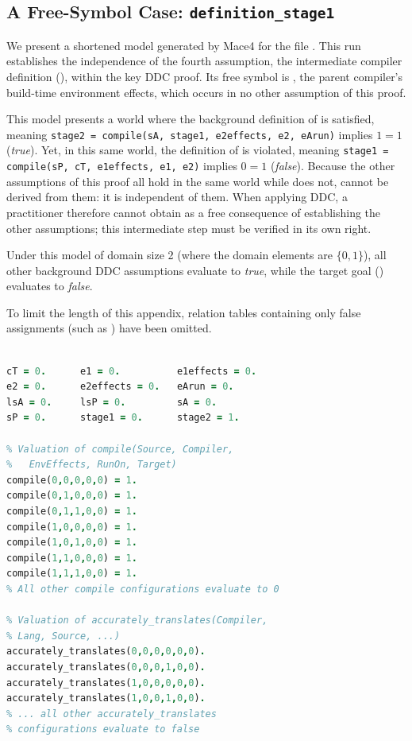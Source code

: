 \subsection{A Free-Symbol Case: \texttt{definition\_stage1}}

We present a shortened model generated by Mace4 for the file . This run establishes the independence of the fourth assumption, the intermediate compiler definition (), within the key DDC proof. Its free symbol is , the parent compiler's build-time environment effects, which occurs in no other assumption of this proof.

This model presents a world where the background definition of  is satisfied, meaning \texttt{stage2 = \allowbreak{}compile(sA, \allowbreak{}stage1, \allowbreak{}e2effects, \allowbreak{}e2, \allowbreak{}eArun)} implies $1 = 1$ (\emph{true}). Yet, in this same world, the definition of  is violated, meaning \texttt{stage1 = \allowbreak{}compile(sP, \allowbreak{}cT, \allowbreak{}e1effects, \allowbreak{}e1, \allowbreak{}e2)} implies $0 = 1$ (\emph{false}). Because the other assumptions of this proof all hold in the same world while  does not,  cannot be derived from them: it is independent of them. When applying DDC, a practitioner therefore cannot obtain  as a free consequence of establishing the other assumptions; this intermediate step must be verified in its own right.

Under this model of domain size 2 (where the domain elements are $\{0, 1\}$), all other background DDC assumptions evaluate to \emph{true}, while the target goal () evaluates to \emph{false}.

To limit the length of this appendix, relation tables containing only false assignments (such as ) have been omitted.

\begin{lstlisting}[language=Prolog, float=tb, caption={Satisfying model for ddc-independence-4.}]
% Interpretation of size 2 {0,1}

cT = 0.      e1 = 0.          e1effects = 0.
e2 = 0.      e2effects = 0.   eArun = 0.
lsA = 0.     lsP = 0.         sA = 0.
sP = 0.      stage1 = 0.      stage2 = 1.

% Valuation of compile(Source, Compiler,
%   EnvEffects, RunOn, Target)
compile(0,0,0,0,0) = 1.
compile(0,1,0,0,0) = 1.
compile(0,1,1,0,0) = 1.
compile(1,0,0,0,0) = 1.
compile(1,0,1,0,0) = 1.
compile(1,1,0,0,0) = 1.
compile(1,1,1,0,0) = 1.
% All other compile configurations evaluate to 0

% Valuation of accurately_translates(Compiler,
% Lang, Source, ...)
accurately_translates(0,0,0,0,0,0).
accurately_translates(0,0,0,1,0,0).
accurately_translates(1,0,0,0,0,0).
accurately_translates(1,0,0,1,0,0).
% ... all other accurately_translates
% configurations evaluate to false
\end{lstlisting}

